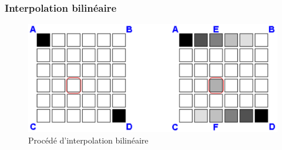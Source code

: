 \documentclass[12pt, a4paper]{article}
\begin{document}
\pagebreak

\subsubsection{Interpolation bilinéaire}

\begin{figure}[h]
	\centering
	   \caption{Procédé d'interpolation bilinéaire}
	   \bigskip
	   \includegraphics[scale=1]{interpolation_bil}
\end{figure}
\end{document}
